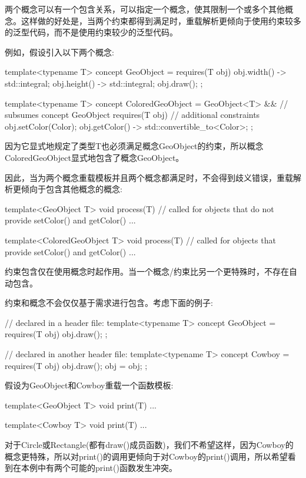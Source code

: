 
两个概念可以有一个包含关系，可以指定一个概念，使其限制一个或多个其他概念。这样做的好处是，当两个约束都得到满足时，重载解析更倾向于使用约束较多的泛型代码，而不是使用约束较少的泛型代码。

例如，假设引入以下两个概念:

\begin{cpp}
template<typename T>
concept GeoObject = requires(T obj) {
	{ obj.width() } -> std::integral;
	{ obj.height() } -> std::integral;
	obj.draw();
};

template<typename T>
concept ColoredGeoObject =
	GeoObject<T> && // subsumes concept GeoObject
	requires(T obj) { // additional constraints
		obj.setColor(Color{});
		{ obj.getColor() } -> std::convertible_to<Color>;
	};
\end{cpp}

因为它显式地规定了类型T也必须满足概念GeoObject的约束，所以概念ColoredGeoObject显式地包含了概念GeoObject。

因此，当为两个概念重载模板并且两个概念都满足时，不会得到歧义错误，重载解析更倾向于包含其他概念的概念:

\begin{cpp}
template<GeoObject T>
void process(T) // called for objects that do not provide setColor() and getColor()
{
	...
}

template<ColoredGeoObject T>
void process(T) // called for objects that provide setColor() and getColor()
{
	...
}
\end{cpp}

约束包含仅在使用概念时起作用。当一个概念/约束比另一个更特殊时，不存在自动包含。

约束和概念不会仅仅基于需求进行包含。考虑下面的例子:

\begin{cpp}
// declared in a header file:
template<typename T>
concept GeoObject = requires(T obj) {
						obj.draw();
					};
					
// declared in another header file:
template<typename T>
concept Cowboy = requires(T obj) {
					obj.draw();
					obj = obj;
				};
\end{cpp}

假设为GeoObject和Cowboy重载一个函数模板:

\begin{cpp}
template<GeoObject T>
void print(T) {
	...
}

template<Cowboy T>
void print(T) {
	...
}
\end{cpp}

对于Circle或Rectangle(都有draw()成员函数)，我们不希望这样，因为Cowboy的概念更特殊，所以对print()的调用更倾向于对Cowboy的print()调用，所以希望看到在本例中有两个可能的print()函数发生冲突。

